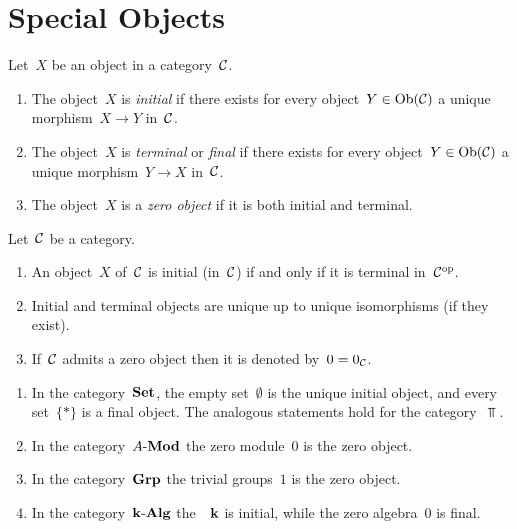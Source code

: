 



\section{Special Objects}


\begin{definition}
  Let~$X$ be an object in a category~$\mathcal{C}$.
  \begin{enumerate}
    \item
      The object~$X$ is \emph{initial} if there exists  for every object~$Y \in \operatorname{Ob}(\mathcal{C})$ a unique morphism~$X \to Y$ in~$\mathcal{C}$.
    \item
      The object~$X$ is \emph{terminal} or \emph{final} if there exists for every object~$Y \in \operatorname{Ob}(\mathcal{C})$ a unique morphism~$Y \to X$ in~$\mathcal{C}$.
    \item
      The object~$X$ is a \emph{zero object} if it is both initial and terminal.
  \end{enumerate}
\end{definition}


\begin{remark}
  Let~$\mathcal{C}$ be a category.
  \begin{enumerate}
    \item
      An object~$X$ of~$\mathcal{C}$ is initial (in~$\mathcal{C}$) if and only if it is terminal in~$\mathcal{C}^{\mathrm{op}}$.
    \item
      Initial and terminal objects are unique up to unique isomorphisms (if they exist).
    \item
      If~$\mathcal{C}$ admits a zero object then it is denoted by~$0 = 0_{\mathcal{C}}$.
  \end{enumerate}
\end{remark}


\begin{example}
  \leavevmode
  \begin{enumerate}
    \item
      In the category~$\mathbf{Set}$, the empty set~$\emptyset$ is the unique initial object, and every  set~$\{\ast\}$ is a final object.
      The analogous statements hold for the category~$\Top$.
    \item
      In the category~$\text{$A$-$\mathbf{Mod}$}$ the zero module~$0$ is the zero object.
    \item
      In the category~$\mathbf{Grp}$ the trivial groups~$1$ is the zero object.
    \item
      In the category~$\text{$\mathbf{k}$-$\mathbf{Alg}$}$ the~{\kalg}~$\mathbf{k}$ is initial, while the zero algebra~$0$ is final.
  \end{enumerate}
\end{example}


